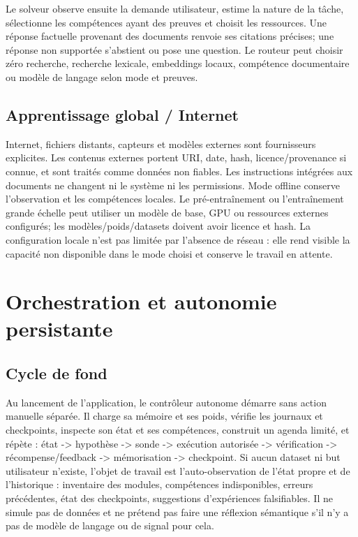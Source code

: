 \documentclass[11pt,a4paper,oneside]{report}
\begin{document}
Le solveur observe ensuite la demande utilisateur, estime la nature de la tâche, sélectionne les compétences ayant des preuves et choisit les ressources. Une réponse factuelle provenant des documents renvoie ses citations précises; une réponse non supportée s'abstient ou pose une question. Le routeur peut choisir zéro recherche, recherche lexicale, embeddings locaux, compétence documentaire ou modèle de langage selon mode et preuves.

\section{Apprentissage global / Internet}
Internet, fichiers distants, capteurs et modèles externes sont fournisseurs explicites. Les contenus externes portent URI, date, hash, licence/provenance si connue, et sont traités comme données non fiables. Les instructions intégrées aux documents ne changent ni le système ni les permissions. Mode offline conserve l'observation et les compétences locales. Le pré-entraînement ou l'entraînement grande échelle peut utiliser un modèle de base, GPU ou ressources externes configurés; les modèles/poids/datasets doivent avoir licence et hash. La configuration locale n'est pas limitée par l'absence de réseau : elle rend visible la capacité non disponible dans le mode choisi et conserve le travail en attente.

\chapter{Orchestration et autonomie persistante}
\section{Cycle de fond}
Au lancement de l'application, le contrôleur autonome démarre sans action manuelle séparée. Il charge sa mémoire et ses poids, vérifie les journaux et checkpoints, inspecte son état et ses compétences, construit un agenda limité, et répète : état -> hypothèse -> sonde -> exécution autorisée -> vérification -> récompense/feedback -> mémorisation -> checkpoint. Si aucun dataset ni but utilisateur n'existe, l'objet de travail est l'auto-observation de l'état propre et de l'historique : inventaire des modules, compétences indisponibles, erreurs précédentes, état des checkpoints, suggestions d'expériences falsifiables. Il ne simule pas de données et ne prétend pas faire une réflexion sémantique s'il n'y a pas de modèle de langage ou de signal pour cela.
\end{document}
